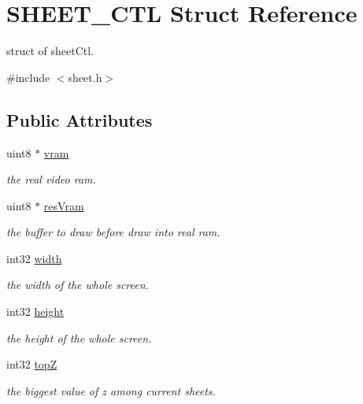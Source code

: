 \hypertarget{struct_s_h_e_e_t___c_t_l}{}\section{S\+H\+E\+E\+T\+\_\+\+C\+T\+L Struct Reference}
\label{struct_s_h_e_e_t___c_t_l}


struct of sheet\+Ctl.  




{\ttfamily \#include $<$sheet.\+h$>$}

\subsection*{Public Attributes}
\begin{DoxyCompactItemize}
\item 
uint8 $\ast$ \hyperlink{struct_s_h_e_e_t___c_t_l_a2d8f8732b3dddffe2ada89ed06c8c4a2}{vram}
\begin{DoxyCompactList}\small\item\em the real video ram. \end{DoxyCompactList}\item 
uint8 $\ast$ \hyperlink{struct_s_h_e_e_t___c_t_l_a426b4ed9d4a90b8c1088b6985247dff8}{res\+Vram}
\begin{DoxyCompactList}\small\item\em the buffer to draw before draw into real ram. \end{DoxyCompactList}\item 
int32 \hyperlink{struct_s_h_e_e_t___c_t_l_a4a80677c76f07b597e276272bbace4d3}{width}
\begin{DoxyCompactList}\small\item\em the width of the whole screen. \end{DoxyCompactList}\item 
int32 \hyperlink{struct_s_h_e_e_t___c_t_l_a6587daa4ab0e04350d417a8daf705dbb}{height}
\begin{DoxyCompactList}\small\item\em the height of the whole screen. \end{DoxyCompactList}\item 
int32 \hyperlink{struct_s_h_e_e_t___c_t_l_a9c553d8295dd7a77fbee4f8a2e019a5e}{top\+Z}
\begin{DoxyCompactList}\small\item\em the biggest value of z among current sheets. \end{DoxyCompactList}\item 

\end{DoxyCompactItemize}
